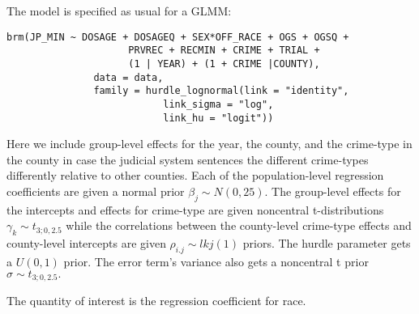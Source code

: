 \documentclass[
  letterpaper,
  DIV=11,
  numbers=noendperiod]{scrartcl}
\begin{document}
The model is specified as usual for a GLMM:

\begin{verbatim}
brm(JP_MIN ~ DOSAGE + DOSAGEQ + SEX*OFF_RACE + OGS + OGSQ +
                     PRVREC + RECMIN + CRIME + TRIAL +
                     (1 | YEAR) + (1 + CRIME |COUNTY),
               data = data,
               family = hurdle_lognormal(link = "identity",
                           link_sigma = "log",
                           link_hu = "logit"))
\end{verbatim}

Here we include group-level effects for the year, the county, and the
crime-type in the county in case the judicial system sentences the
different crime-types differently relative to other counties. Each of
the population-level regression coefficients are given a normal prior
\(\beta_j \sim N(0, 25).\) The group-level effects for the intercepts
and effects for crime-type are given noncentral t-distributions
\(\gamma_k \sim t_{3; 0, 2.5}\) while the correlations between the
county-level crime-type effects and county-level intercepts are given
\(\rho_{i.j} \sim lkj(1)\) priors. The hurdle parameter gets a
\(U(0,1)\) prior. The error term's variance also gets a noncentral t
prior \(\sigma \sim t_{3; 0, 2.5}.\)

The quantity of interest is the regression coefficient for race.
\end{document}
